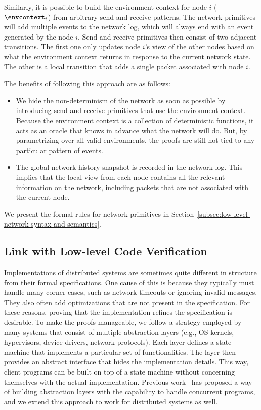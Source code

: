 Similarly,
it is possible to build the environment context for node $i$ ($\envcontext_i$)
from arbitrary send and receive patterns.
The network primitives will
add multiple events to the network log, which will always end with an event generated by the node $i$.
Send and receive primitives then consist of two
adjacent transitions.
The first one only updates node $i$'s view of the other nodes based on what the environment context returns
in response to the current network state.
The other is a local transition that adds a single packet associated with node $i$.

The benefits of following this approach are as follows:
\begin{itemize}
 \item We hide the non-determinism of the network as soon as possible by introducing send and receive primitives that use the environment context.
   Because the environment context is a collection of deterministic functions, it acts as an oracle that knows in advance what the network will do.
   But, by parametrizing over all valid environments, the proofs are still not tied to any particular pattern of events.
 \item The global network history snapshot is recorded in the network log. This implies that the local view from each node
contains all the relevant information on the network, including packets that are not associated with the current node.
\end{itemize}
We present the formal rules for network primitives in Section~\ref{subsec:low-level-network-syntax-and-semantics}.

\subsection{Link with Low-level Code Verification}
\label{subsec:link-with-low-level-code-verification}

Implementations of distributed systems are sometimes quite different in structure from their formal specifications.
One cause of this is because they typically must handle many corner cases, such as network timeouts or ignoring invalid messages.
They also often add optimizations that are not present in the specification.
For these reasons, proving that the implementation refines the specification is desirable.
To make the proofs manageable, we follow a strategy employed by many systems that consist of multiple abstraction layers
(e.g., OS kernels, hypervisors, device drivers, network protocols).
Each layer defines a state machine that implements a particular set of functionalities.
The layer then provides an abstract interface that hides the implementation details.
This way, client programs can be built on top of a state machine without concerning themselves with the actual implementation.
Previous work~\cite{concurrency} has proposed a way of building abstraction layers with the
capability to handle concurrent programs, and we extend this approach to work for distributed systems as well.

